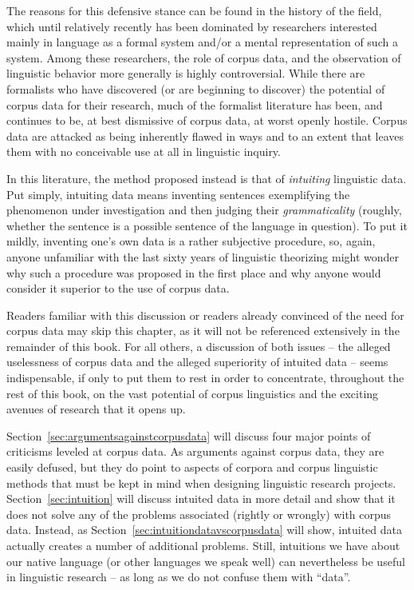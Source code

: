 The reasons for this defensive stance can be found in the history of the field, which until relatively recently has been dominated by researchers interested mainly in language as a formal system and\slash or a mental representation of such a system. Among these researchers, the role of corpus data, and the observation  of linguistic behavior more generally is highly controversial. While there are formalists who have discovered (or are beginning to discover) the potential of corpus data for their research, much of the formalist literature has been, and continues to be, at best dismissive of corpus data, at worst openly hostile. Corpus data are attacked as being inherently flawed in ways and to an extent that leaves them with no conceivable use at all in linguistic inquiry.

In this literature, the method proposed instead is that of \textit{intuiting}  linguistic data. Put simply, intuiting data means inventing sentences exemplifying the phenomenon under investigation and then judging their \textit{grammaticality}  (roughly, whether the sentence is a possible sentence of the language in question). To put it mildly, inventing one's own data is a rather subjective procedure, so, again, anyone unfamiliar with the last sixty years of linguistic theorizing might wonder why such a procedure was proposed in the first place and why anyone would consider it superior to the use of corpus data.

Readers familiar with this discussion or readers already convinced of the need for corpus data may skip this chapter, as it will not be referenced extensively in the remainder of this book. For all others, a discussion of both issues -- the alleged uselessness of corpus data and the alleged superiority of intuited data -- seems indispensable, if only to put them to rest in order to concentrate, throughout the rest of this book, on the vast potential of corpus linguistics and the exciting avenues of research that it opens up.

Section~\ref{sec:argumentsagainstcorpusdata} will discuss four major points of criticisms leveled at corpus data. As arguments against corpus data, they are easily defused, but they do point to aspects of corpora and corpus linguistic methods that must be kept in mind when designing  linguistic research projects. Section~\ref{sec:intuition} will discuss intuited  data in more detail and show that it does not solve any of the problems associated (rightly or wrongly) with corpus data. Instead, as Section~\ref{sec:intuitiondatavscorpusdata} will show, intuited data actually creates a number of additional problems. Still, intuitions  we have about our native language (or other languages we speak well) can nevertheless be useful in linguistic research -- as long as we do not confuse them with ``data''.

